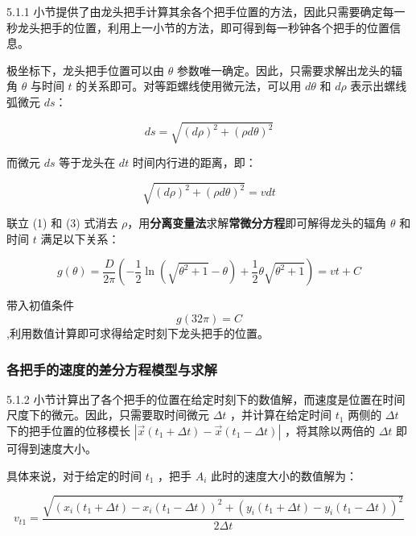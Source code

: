 \documentclass[a4paper]{article}
\begin{document}
		5.1.1 小节提供了由龙头把手计算其余各个把手位置的方法，因此只需要确定每一秒龙头把手的位置，利用上一小节的方法，即可得到每一秒钟各个把手的位置信息。

		极坐标下，龙头把手位置可以由 $\theta$ 参数唯一确定。因此，只需要求解出龙头的辐角 $\theta$ 与时间 $t$ 的关系即可。对等距螺线使用微元法，可以用 $d\theta$ 和 $d\rho$ 表示出螺线弧微元 $ds$：

		$$ ds = \sqrt{(d\rho)^2 + (\rho d\theta) ^ 2}$$

		而微元 $ds$ 等于龙头在 $dt$ 时间内行进的距离，即：

		\begin{equation}
			\sqrt{(d\rho)^2 + (\rho d\theta) ^ 2} = vdt
		\end{equation}

		联立 (1) 和 (3) 式消去 $\rho$，用\textbf{分离变量法}求解\textbf{常微分方程}即可解得龙头的辐角 $\theta$ 和时间 $t$ 满足以下关系：

		\begin{equation}
			g(\theta) = \frac{D}{2\pi}(-\frac{1}{2}\ln(\sqrt{\theta^2+1}-\theta)+\frac{1}{2}\theta\sqrt{\theta^2+1})=vt+C
		\end{equation}


		带入初值条件$$g(32  \pi) = C$$,利用数值计算即可求得给定时刻下龙头把手的位置。

	\subsubsection{各把手的速度的差分方程模型与求解}

		5.1.2 小节计算出了各个把手的位置在给定时刻下的数值解，而速度是位置在时间尺度下的微元。因此，只需要取时间微元 $\Delta t$ ，并计算在给定时间 $t_1$ 两侧的 $\Delta t$ 下的把手位置的位移模长 $|\vec{x}(t_1+\Delta t) - \vec{x}(t_1 - \Delta t)|$ ，将其除以两倍的 $\Delta t$ 即可得到速度大小。



		具体来说，对于给定的时间 $t_1$ ，把手 $A_i$ 此时的速度大小的数值解为：

		\begin{equation}
			v_{t1} = \dfrac{\sqrt{(x_i(t_1 + \Delta t) - x_i(t_1 - \Delta t))^2 + (y_i(t_1 + \Delta t) - y_i(t_1 - \Delta t))^2}}{2\Delta t}
		\end{equation}

\end{document}
